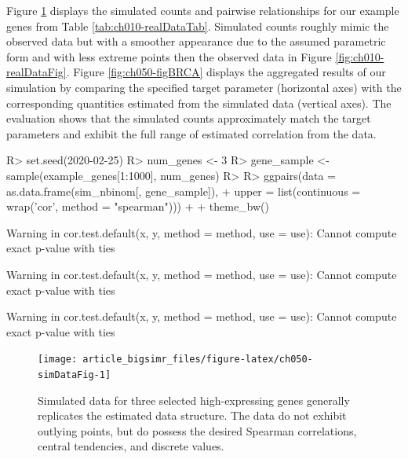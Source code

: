 \documentclass[
]{jss}
\begin{document}
\begin{CodeChunk}
\end{CodeChunk}

Figure \ref{fig:ch050-simDataFig} displays the simulated counts and pairwise relationships for our example genes from Table \ref{tab:ch010-realDataTab}.
Simulated counts roughly mimic the observed data but with a smoother appearance due to the assumed parametric form and with less extreme points then the observed data in Figure \ref{fig:ch010-realDataFig}. Figure \ref{fig:ch050-figBRCA} displays the aggregated results of our simulation by comparing the specified target parameter (horizontal axes) with the corresponding quantities estimated from the simulated data (vertical axes). The evaluation shows that the simulated counts approximately match the target parameters and exhibit the full range of estimated correlation from the data.

\begin{CodeChunk}
\begin{CodeInput}
R> set.seed(2020-02-25)
R> num_genes <- 3
R> gene_sample <- sample(example_genes[1:1000], num_genes)
R> 
R> ggpairs(data = as.data.frame(sim_nbinom[, gene_sample]),
+         upper = list(continuous = wrap('cor', method = "spearman"))) + 
+   theme_bw()
\end{CodeInput}
\begin{CodeOutput}
Warning in cor.test.default(x, y, method = method, use = use): Cannot compute
exact p-value with ties
\end{CodeOutput}
\begin{CodeOutput}
Warning in cor.test.default(x, y, method = method, use = use): Cannot compute
exact p-value with ties
\end{CodeOutput}
\begin{CodeOutput}
Warning in cor.test.default(x, y, method = method, use = use): Cannot compute
exact p-value with ties
\end{CodeOutput}
\begin{figure}

{\centering \texttt{[image: article\_bigsimr\_files/figure-latex/ch050-simDataFig-1]} 

}

\caption[Simulated data for three selected high-expressing genes generally replicates the estimated data structure]{Simulated data for three selected high-expressing genes generally replicates the estimated data structure. The data do not exhibit outlying points, but do possess the desired Spearman correlations, central tendencies, and discrete values.}\label{fig:ch050-simDataFig}
\end{figure}
\end{CodeChunk}
\end{document}
